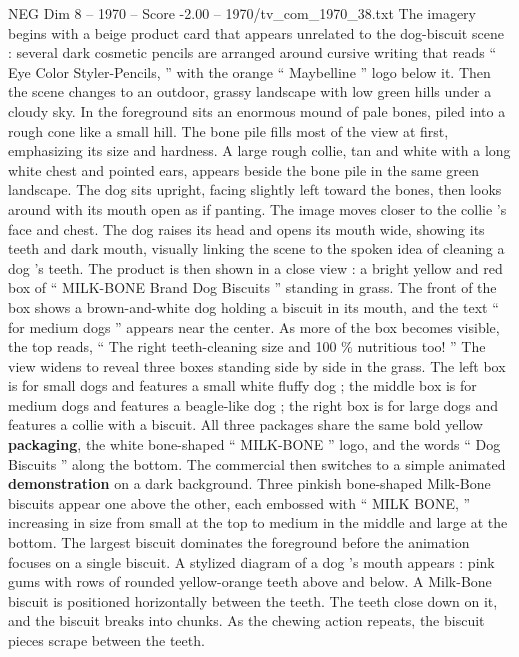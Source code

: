 \begin{textsample}{NEG Dim 8 – 1970 – Score -2.00 – 1970/tv\_com\_1970\_38.txt}  \label{ex:f8_neg_065}
The imagery begins with a beige product card that appears unrelated to the dog-biscuit scene : several dark cosmetic pencils are arranged around cursive writing that reads “ Eye Color Styler-Pencils, ” with the orange “ Maybelline ” logo below it.
Then the scene changes to an outdoor, grassy landscape with low green hills under a cloudy sky.
In the foreground sits an enormous mound of pale bones, piled into a rough cone like a small hill.
The bone pile fills most of the view at first, emphasizing its size and hardness.
A large rough collie, tan and white with a long white chest and pointed ears, appears beside the bone pile in the same green landscape.
The dog sits upright, facing slightly left toward the bones, then looks around with its mouth open as if panting.
The image moves closer to the collie ’s face and chest.
The dog raises its head and opens its mouth wide, showing its teeth and dark mouth, visually linking the scene to the spoken idea of cleaning a dog ’s teeth.
The product is then shown in a close view : a bright yellow and red box of “ MILK-BONE Brand Dog Biscuits ” standing in grass.
The front of the box shows a brown-and-white dog holding a biscuit in its mouth, and the text “ for medium dogs ” appears near the center.
As more of the box becomes visible, the top reads, “ The right teeth-cleaning size and 100 \% nutritious too! ” The view widens to reveal three boxes standing side by side in the grass.
The left box is for small dogs and features a small white fluffy dog ; the middle box is for medium dogs and features a beagle-like dog ; the right box is for large dogs and features a collie with a biscuit.
All three packages share the same bold yellow \textbf{packaging}, the white bone-shaped “ MILK-BONE ” logo, and the words “ Dog Biscuits ” along the bottom.
The commercial then switches to a simple animated \textbf{demonstration} on a dark background.
Three pinkish bone-shaped Milk-Bone biscuits appear one above the other, each embossed with “ MILK BONE, ” increasing in size from small at the top to medium in the middle and large at the bottom.
The largest biscuit dominates the foreground before the animation focuses on a single biscuit.
A stylized diagram of a dog ’s mouth appears : pink gums with rows of rounded yellow-orange teeth above and below.
A Milk-Bone biscuit is positioned horizontally between the teeth.
The teeth close down on it, and the biscuit breaks into chunks.
As the chewing action repeats, the biscuit pieces scrape between the teeth.

\end{textsample}
